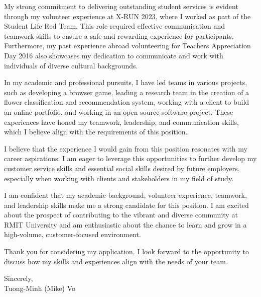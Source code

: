 \documentclass[a4paper,11pt]{article}
\newcommand{\p}[1]{#1\\\vspace{6pt}}
\begin{document}
\p{My strong commitment to delivering outstanding student services is evident through my volunteer experience at X-RUN 2023, where I worked as part of the Student Life Red Team. This role required effective communication and teamwork skills to ensure a safe and rewarding experience for participants. Furthermore, my past experience abroad volunteering for Teachers Appreciation Day 2016 also showcases my dedication to communicate and work with individuals of diverse cultural backgrounds.}

\p{In my academic and professional pursuits, I have led teams in various projects, such as developing a browser game, leading a research team in the creation of a flower classification and recommendation system, working with a client to build an online portfolio, and working in an open-source software project. These experiences have honed my teamwork, leadership, and communication skills, which I believe align with the requirements of this position.}

\p{I believe that the experience I would gain from this position resonates with my career aspirations. I am eager to leverage this opportunities to further develop my customer service skills and essential social skills desired by future employers, especially when working with clients and stakeholders in my field of study.}

\p{I am confident that my academic background, volunteer experience, teamwork, and leadership skills make me a strong candidate for this position. I am excited about the prospect of contributing to the vibrant and diverse community at RMIT University and am enthusiastic about the chance to learn and grow in a high-volume, customer-focused environment.}

\p{Thank you for considering my application. I look forward to the opportunity to discuss how my skills and experiences align with the needs of your team.}

\p{Sincerely,\\
Tuong-Minh (Mike) Vo}
%
\end{document}
